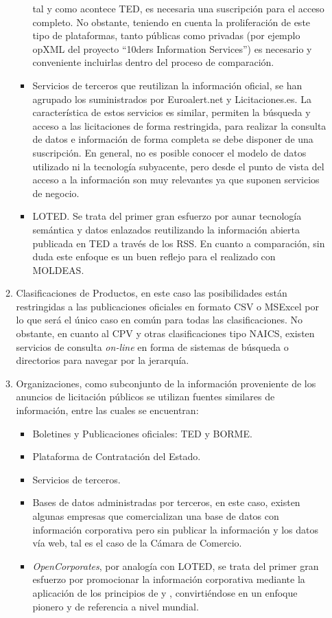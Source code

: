 \begin{enumerate}
\begin{enumerate}
\begin{itemize}
tal y como acontece TED, es necesaria una suscripción para el acceso completo. No obstante, teniendo 
en cuenta la proliferación de este tipo de plataformas, tanto públicas como privadas (por ejemplo \gls{opXML} del proyecto ``10ders Information Services'') 
es necesario y conveniente incluirlas dentro del proceso de comparación.
 \item Servicios de terceros que reutilizan la información oficial, se han agrupado los suministrados por 
Euroalert.net y Licitaciones.es. La característica de estos servicios es similar, permiten la búsqueda y acceso 
a las licitaciones de forma restringida, para realizar la consulta de datos e información 
de forma completa se debe disponer de una suscripción. En general, no es posible conocer el modelo de datos utilizado 
ni la tecnología subyacente, pero desde el punto de vista del acceso a la información son muy relevantes ya que 
suponen servicios de negocio.
\item LOTED. Se trata del primer gran esfuerzo por aunar tecnología semántica y datos enlazados reutilizando la información 
abierta publicada en TED a través de los \gls{RSS}. En cuanto a comparación, sin duda este enfoque es un buen reflejo para el realizado 
con MOLDEAS.
\end{itemize}


\item Clasificaciones de Productos, en este caso las posibilidades están restringidas a las publicaciones oficiales 
en formato \gls{CSV} o MSExcel por lo que será el único caso en común para todas las clasificaciones. No obstante, en cuanto 
al CPV y otras clasificaciones tipo NAICS, existen servicios de consulta \textit{on-line} en forma de sistemas de búsqueda o directorios para navegar 
por la jerarquía.

\item Organizaciones, como subconjunto de la información proveniente de los anuncios de licitación públicos se utilizan 
fuentes similares de información, entre las cuales se encuentran:
\begin{itemize}
 \item Boletines y Publicaciones oficiales: \gls{TED} y \gls{BORME}.
 \item Plataforma de Contratación del Estado.
 \item Servicios de terceros.
 \item Bases de datos administradas por terceros, en este caso, existen algunas empresas que comercializan 
una base de datos con información corporativa pero sin publicar la información y los datos vía web, tal es 
el caso de la Cámara de Comercio.
 \item \textit{OpenCorporates}, por analogía con LOTED, se trata del primer gran esfuerzo por promocionar 
la información corporativa mediante la aplicación de los principios de \opendata y \linkeddata, convirtiéndose 
en un enfoque pionero y de referencia a nivel mundial.
\end{itemize}
\end{enumerate}



\end{enumerate}
